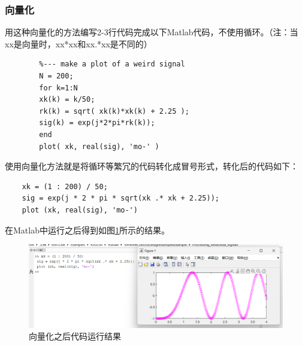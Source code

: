 \documentclass[UTF8]{ctexart}
\begin{document}
\subsubsection{向量化}
\begin{framed}
    用这种向量化的方法编写2-3行代码完成以下Matlab代码，不使用循环。（注：当xx是向量时，xx*xx和xx.*xx是不同的）
    \begin{verbatim}
        %--- make a plot of a weird signal 
        N = 200; 
        for k=1:N 
        xk(k) = k/50; 
        rk(k) = sqrt( xk(k)*xk(k) + 2.25 ); 
        sig(k) = exp(j*2*pi*rk(k)); 
        end 
        plot( xk, real(sig), 'mo-' ) 
    \end{verbatim}
\end{framed}
使用向量化方法就是将循环等繁冗的代码转化成冒号形式，转化后的代码如下：
\begin{verbatim}
    xk = (1 : 200) / 50;
    sig = exp(j * 2 * pi * sqrt(xk .* xk + 2.25));
    plot (xk, real(sig), 'mo-')
\end{verbatim}
在Matlab中运行之后得到如图\ref{img:vector_transform}所示的结果。
\begin{figure}[htbp]
    \centering
    \includegraphics[width=0.7\linewidth]{vector_transform.png}
    \caption{向量化之后代码运行结果}
    \label{img:vector_transform}
\end{figure}
\end{document}
